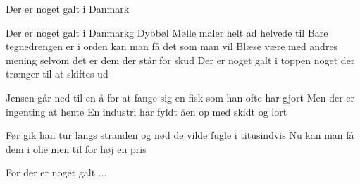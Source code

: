 \begin{sang}{Der er noget galt i Danmark}{}
\begin{vers}
Der er noget galt i Danmarkg
Dybbøl Mølle maler helt
ad helvede til
Bare tegnedrengen er i orden
kan man få det som man vil
Blæse være med andres mening
selvom det er dem
der står for skud
Der er noget galt i toppen
noget der trænger til at skiftes ud
\end{vers}
\begin{vers}
Jensen går ned til en å
for at fange sig en fisk
som han ofte har gjort
Men der er ingenting at hente
En industri har fyldt åen op med
skidt og lort
\end{vers}
\begin{vers}
Før gik han tur
langs stranden og nød
de vilde fugle i titusindvis
Nu kan man få dem i olie
men til for høj en pris
\end{vers}
\begin{vers}
For der er noget galt ...
\end{vers}
\laps
\end{sang}
